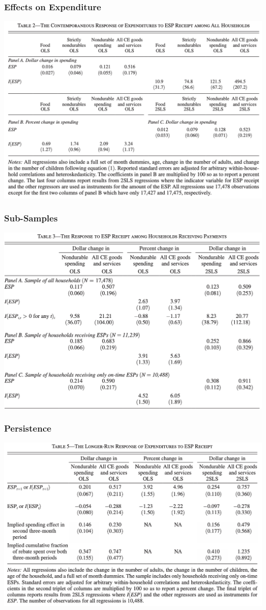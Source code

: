 \documentclass[english,xcolor=svgnames]{beamer}
\begin{document}
\begin{frame}
\frametitle[alignment=center]{Effects on Expenditure}
\centering
\includegraphics[scale=0.6]{figures/PSMJTAB2.png}
\end{frame}

\begin{frame}
\frametitle[alignment=center]{Sub-Samples}
\centering
\includegraphics[scale=0.6]{figures/PSMJTAB3.png}
\end{frame}

\begin{frame}
\frametitle[alignment=center]{Persistence}
\centering
\includegraphics[scale=0.6]{figures/PSMJTAB5.png}
\end{frame}
\end{document}
